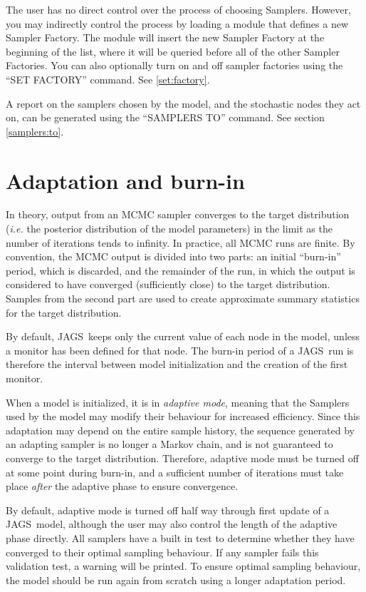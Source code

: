 \documentclass[11pt, a4paper, titlepage]{report}
\newcommand{\JAGS}{\textsf{JAGS}}
\begin{document}
The user has no direct control over the process of choosing
Samplers. However, you may indirectly control the process by loading a
module that defines a new Sampler Factory. The module will insert the
new Sampler Factory at the beginning of the list, where it will be
queried before all of the other Sampler Factories. You can also 
optionally turn on and off sampler factories using the ``SET FACTORY''
command. See \ref{set:factory}.

A report on the samplers chosen by the model, and the stochastic nodes
they act on, can be generated using the ``SAMPLERS TO'' command. See 
section \ref{samplers:to}.
 
\section{Adaptation and burn-in}

In theory, output from an MCMC sampler converges to the target
distribution ({\em i.e.} the posterior distribution of the model
parameters) in the limit as the number of iterations tends to
infinity. In practice, all MCMC runs are finite.  By convention, the
MCMC output is divided into two parts: an initial ``burn-in'' period,
which is discarded, and the remainder of the run, in which the output
is considered to have converged (sufficiently close) to the target
distribution. Samples from the second part are used to create
approximate summary statistics for the target distribution.

By default, \JAGS\ keeps only the current value of each node in the
model, unless a monitor has been defined for that node. The burn-in
period of a \JAGS\ run is therefore the interval between model
initialization and the creation of the first monitor.

When a model is initialized, it is in {\em adaptive mode}, meaning
that the Samplers used by the model may modify their behaviour for
increased efficiency. Since this adaptation may depend on the entire
sample history, the sequence generated by an adapting sampler is no
longer a Markov chain, and is not guaranteed to converge to the target
distribution. Therefore, adaptive mode must be turned off at some
point during burn-in, and a sufficient number of iterations must take
place {\em after} the adaptive phase to ensure convergence.

By default, adaptive mode is turned off half way through first update
of a \JAGS\ model, although the user may also control the length of
the adaptive phase directly.  All samplers have a built in test to
determine whether they have converged to their optimal sampling
behaviour.  If any sampler fails this validation test, a warning will
be printed. To ensure optimal sampling behaviour, the model should be
run again from scratch using a longer adaptation period.
\end{document}
